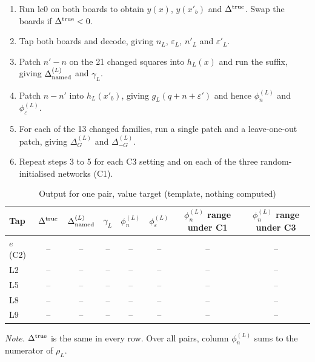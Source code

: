 \documentclass[conference]{IEEEtran}
\begin{document}
\begin{enumerate}
\item Run lc0 on both boards to obtain $y(x)$, $y(x'_b)$ and $\Delta^{\rm true}$. Swap the boards if $\Delta^{\rm true}<0$.
\item Tap both boards and decode, giving $n_L$, $\varepsilon_L$, $n'_L$ and $\varepsilon'_L$.
\item Patch $n'-n$ on the 21 changed squares into $h_L(x)$ and run the suffix, giving $\Delta^{(L)}_{\rm named}$ and $\gamma_L$.
\item Patch $n-n'$ into $h_L(x'_b)$, giving $g_L(q+n+\varepsilon')$ and hence $\phi^{(L)}_n$ and $\phi^{(L)}_\varepsilon$.
\item For each of the 13 changed families, run a single patch and a leave-one-out patch, giving $\Delta^{(L)}_G$ and $\Delta^{(L)}_{-G}$.
\item Repeat steps 3 to 5 for each C3 setting and on each of the three random-initialised networks (C1).
\end{enumerate}

\begin{table}[H]
\centering
\renewcommand{\thetable}{D1}
\caption{Output for one pair, value target (template, nothing computed)}
\label{tab:D1}
\small
\begin{tabular}{lccccccc}
\toprule
Tap & $\Delta^{\rm true}$ & $\Delta^{(L)}_{\rm named}$ & $\gamma_L$ & $\phi^{(L)}_n$ & $\phi^{(L)}_\varepsilon$ & $\phi^{(L)}_n$ range under C1 & $\phi^{(L)}_n$ range under C3 \\
\midrule
$e$ (C2) & -- & -- & -- & -- & -- & -- & -- \\
L2 & -- & -- & -- & -- & -- & -- & -- \\
L5 & -- & -- & -- & -- & -- & -- & -- \\
L8 & -- & -- & -- & -- & -- & -- & -- \\
L9 & -- & -- & -- & -- & -- & -- & -- \\
\bottomrule
\end{tabular}
\par\smallskip
\parbox{\textwidth}{\footnotesize \emph{Note.} $\Delta^{\rm true}$ is the same in every row. Over all pairs, column $\phi^{(L)}_n$ sums to the numerator of $\rho_L$.}
\end{table}
\end{document}
